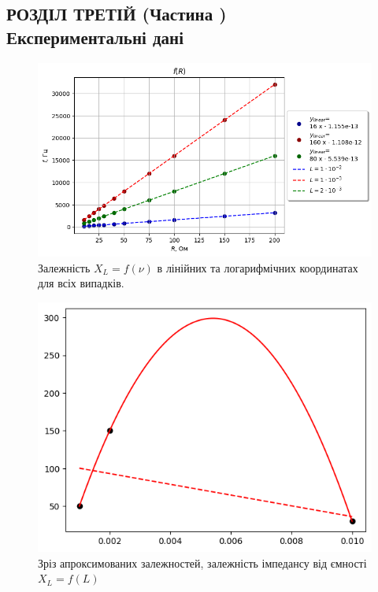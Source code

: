 \documentclass[a4paper,12pt]{article}
\newcommand{\RomanNumeralCaps}[1]{\MakeUppercase{\romannumeral #1}}
\begin{document}
\newpage
	\begin{center}
		\section* {РОЗДІЛ ТРЕТІЙ (Частина \RomanNumeralCaps{2})\\Експериментальні дані}
	\end{center}

    \begin{figure}[h!]
		\centering
		\begin{minipage}[h]{1\linewidth}
			\includegraphics[width=1\linewidth]{Prt sc/Figure_4.png}
			\caption{Залежність $X_L=f(\nu)$  в лінійних та логарифмічних координатах для всіх випадків.}
			\label{Figure_4}
		\end{minipage}
	\end{figure}

    \begin{figure}[h!]
		\centering
		\begin{minipage}[h]{1\linewidth}
			\includegraphics[width=0.8\linewidth]{Prt sc/Figure_5.png}
			\caption{Зріз апроксимованих залежностей, залежність імпедансу від ємності $X_L=f(L)$}
			\label{Figure_5}
		\end{minipage}
	\end{figure}
\end{document}
